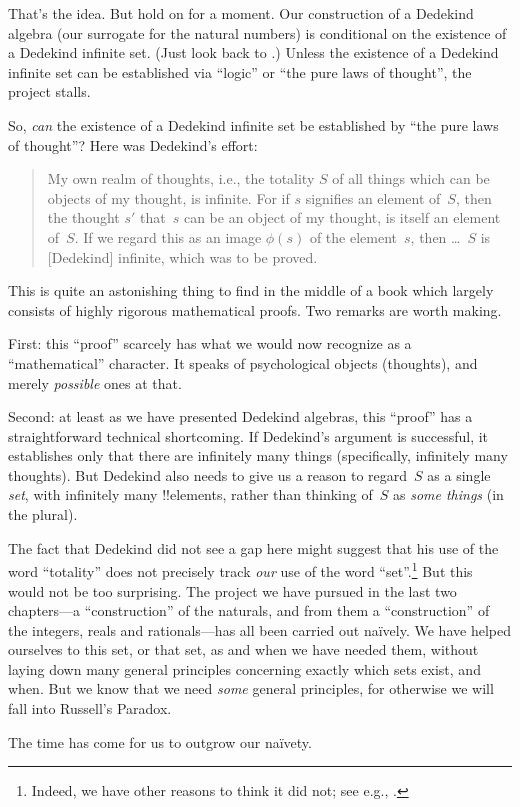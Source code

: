 \documentclass[../../../include/open-logic-section]{subfiles}
\begin{document}
That's the idea. But hold on for a moment. Our construction of a
Dedekind algebra (our surrogate for the natural numbers) is
conditional on the existence of a Dedekind infinite set. (Just look
back to .)
Unless the existence of a Dedekind infinite set can be established via
``logic'' or ``the pure laws of thought'', the project stalls. 

So, \emph{can} the existence of a Dedekind infinite set be established
by ``the pure laws of thought''? Here was Dedekind's effort:
\begin{quote}
  My own realm of thoughts, i.e., the totality $S$ of all things which
  can be objects of my thought, is infinite. For if $s$ signifies an
  element of~$S$, then the thought $s'$ that~$s$ can be an object of
  my thought, is itself an element of~$S$. If we regard this as an
  image $\phi(s)$ of the element~$s$, then \dots~$S$ is [Dedekind]
  infinite, which was to be proved.
	\citep[\S66]{Dedekind1888}
\end{quote}
This is quite an astonishing thing to find in the middle of a book
which largely consists of highly rigorous mathematical proofs. Two
remarks are worth making. 

First: this ``proof'' scarcely has what we would now recognize as a
``mathematical'' character. It speaks of psychological objects
(thoughts), and merely \emph{possible} ones at that.

Second: at least as we have presented Dedekind algebras, this
``proof'' has a straightforward technical shortcoming. If Dedekind's
argument is successful, it establishes only that there are infinitely
many things (specifically, infinitely many thoughts). But Dedekind
also needs to give us a reason to regard~$S$ as a single \emph{set},
with infinitely many !!{element}s, rather than thinking of~$S$ as
\emph{some things} (in the plural). 

The fact that Dedekind did not see a gap here might suggest that his
use of the word ``totality'' does not precisely track \emph{our} use
of the word ``set''.\footnote{Indeed, we have other reasons to think
it did not; see e.g., \citet[p.~23]{Potter2004}.} But this would not be
too surprising. The project we have pursued in the last two
chapters---a ``construction'' of the naturals, and from them a
``construction'' of the integers, reals and rationals---has all been
carried out na\"ively. We have helped ourselves to this set, or that
set, as and when we have needed them, without laying down many general
principles concerning exactly which sets exist, and when. But we know
that we need \emph{some} general principles, for otherwise we will
fall into Russell's Paradox.

 The time has come for us to outgrow our na\"ivety. 
\end{document}
